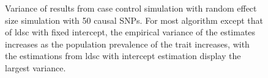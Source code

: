 \begin{figure}
{				
				\label{fig:ldscInCC50RandVar}
			}
			\caption[Variance of Case Control Simulation Results (50 Causal)]
			{Variance of results from case control simulation with random effect size simulation with 50 causal \glspl{SNP}.
				For most algorithm except that of \gls{ldsc} with fixed intercept, the empirical variance of the estimates increases as the population prevalence of the trait increases, with the estimations from \gls{ldsc} with intercept estimation display the largest variance.
			} 
			\label{fig:CC50RandVar}
		\end{figure}
		
